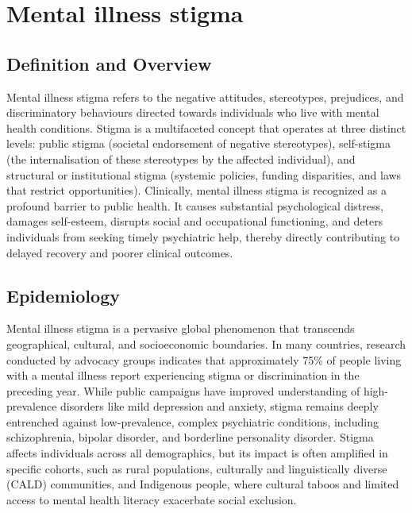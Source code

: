 \chapter{Mental illness stigma}

\section*{Definition and Overview}
Mental illness stigma refers to the negative attitudes, stereotypes, prejudices, and discriminatory behaviours directed towards individuals who live with mental health conditions. Stigma is a multifaceted concept that operates at three distinct levels: public stigma (societal endorsement of negative stereotypes), self-stigma (the internalisation of these stereotypes by the affected individual), and structural or institutional stigma (systemic policies, funding disparities, and laws that restrict opportunities). Clinically, mental illness stigma is recognized as a profound barrier to public health. It causes substantial psychological distress, damages self-esteem, disrupts social and occupational functioning, and deters individuals from seeking timely psychiatric help, thereby directly contributing to delayed recovery and poorer clinical outcomes.

\section*{Epidemiology}
Mental illness stigma is a pervasive global phenomenon that transcends geographical, cultural, and socioeconomic boundaries. In many countries, research conducted by advocacy groups indicates that approximately 75\% of people living with a mental illness report experiencing stigma or discrimination in the preceding year. While public campaigns have improved understanding of high-prevalence disorders like mild depression and anxiety, stigma remains deeply entrenched against low-prevalence, complex psychiatric conditions, including schizophrenia, bipolar disorder, and borderline personality disorder. Stigma affects individuals across all demographics, but its impact is often amplified in specific cohorts, such as rural populations, culturally and linguistically diverse (CALD) communities, and Indigenous people, where cultural taboos and limited access to mental health literacy exacerbate social exclusion.

